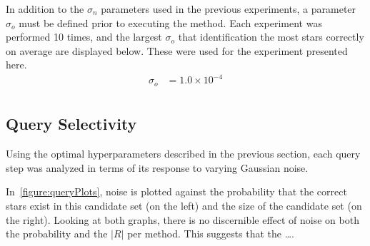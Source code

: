 In addition to the $\sigma_n$ parameters used in the previous experiments, a parameter $\sigma_o$ must be defined
prior to executing the  method.
Each experiment was performed 10 times, and the largest $\sigma_o$ that identification the most stars correctly on
average are displayed below.
These were used for the experiment presented here.
\begin{align*}
    \sigma_o &= 1.0 \times 10^{-4}\\
\end{align*}

\subsection{Query Selectivity}\label{subsec:querySelectivityResults}
Using the optimal hyperparameters described in the previous section, each query step was analyzed in terms of its
response to varying Gaussian noise.

\begin{figure}
\end{figure}

In~\autoref{figure:queryPlots}, noise is plotted against the probability that the correct stars exist in this
candidate set (on the left) and the size of the candidate set (on the right).
Looking at both graphs, there is no discernible effect of noise on both the probability and the $\lvert R \rvert$ per
method.
This suggests that the \ldots.

